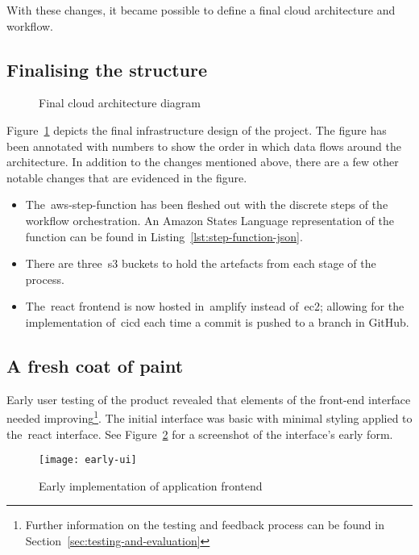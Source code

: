 With these changes, it became possible to define a final cloud architecture and workflow.

\subsection{Finalising the structure}\label{subsec:finalising-the-structure}

\begin{figure}[!htb]
    \minipage{\textwidth}
    
    \caption{Final cloud architecture diagram}\label{fig:final_design}
    \endminipage\hfill
\end{figure}

Figure~\ref{fig:final_design} depicts the final infrastructure design of the project.
The figure has been annotated with numbers to show the order in which data flows around the architecture.
In addition to the changes mentioned above, there are a few other notable changes that are evidenced in the figure.

\begin{itemize}
    \item The~\gls{aws-step-function} has been fleshed out with the discrete steps of the workflow orchestration.
    An Amazon States Language representation of the function can be found in Listing~\ref{lst:step-function-json}.
    \item There are three~\gls{s3} buckets to hold the artefacts from each stage of the process.
    \item The~\gls{react} frontend is now hosted in~\gls{amplify} instead of~\gls{ec2}; allowing for the implementation of~\gls{cicd} each time a commit is pushed to a branch in GitHub.
\end{itemize}

\subsection{A fresh coat of paint}\label{subsec:a-fresh-coat-of-paint}

Early user testing of the product revealed that elements of the front-end interface needed improving\footnote{Further information on the testing and feedback process can be found in Section~\ref{sec:testing-and-evaluation}}.
The initial interface was basic with minimal styling applied to the~\gls{react} interface.
See Figure~\ref{fig:early-fe} for a screenshot of the interface's early form.

\begin{figure}[!htb]
    \minipage{\textwidth}
    \texttt{[image: early-ui]}
    \caption{Early implementation of application frontend}\label{fig:early-fe}
    \endminipage\hfill
\end{figure}

